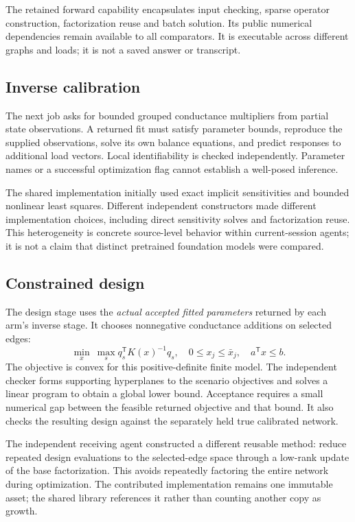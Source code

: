 \documentclass[11pt,letterpaper]{article}
\begin{document}
The retained forward capability encapsulates input checking, sparse operator construction, factorization reuse and batch solution. Its public numerical dependencies remain available to all comparators. It is executable across different graphs and loads; it is not a saved answer or transcript.

\subsection{Inverse calibration}

The next job asks for bounded grouped conductance multipliers from partial state observations. A returned fit must satisfy parameter bounds, reproduce the supplied observations, solve its own balance equations, and predict responses to additional load vectors. Local identifiability is checked independently. Parameter names or a successful optimization flag cannot establish a well-posed inference.

The shared implementation initially used exact implicit sensitivities and bounded nonlinear least squares. Different independent constructors made different implementation choices, including direct sensitivity solves and factorization reuse. This heterogeneity is concrete source-level behavior within current-session agents; it is not a claim that distinct pretrained foundation models were compared.

\subsection{Constrained design}

The design stage uses the \emph{actual accepted fitted parameters} returned by each arm's inverse stage. It chooses nonnegative conductance additions on selected edges:
\[
\min_{x}\ \max_s q_s^\mathsf{T}K(x)^{-1}q_s,
\quad 0\leq x_j\leq \bar x_j,\quad a^\mathsf{T}x\leq b.
\]
The objective is convex for this positive-definite finite model. The independent checker forms supporting hyperplanes to the scenario objectives and solves a linear program to obtain a global lower bound. Acceptance requires a small numerical gap between the feasible returned objective and that bound. It also checks the resulting design against the separately held true calibrated network.

The independent receiving agent constructed a different reusable method: reduce repeated design evaluations to the selected-edge space through a low-rank update of the base factorization. This avoids repeatedly factoring the entire network during optimization. The contributed implementation remains one immutable asset; the shared library references it rather than counting another copy as growth.
\end{document}
